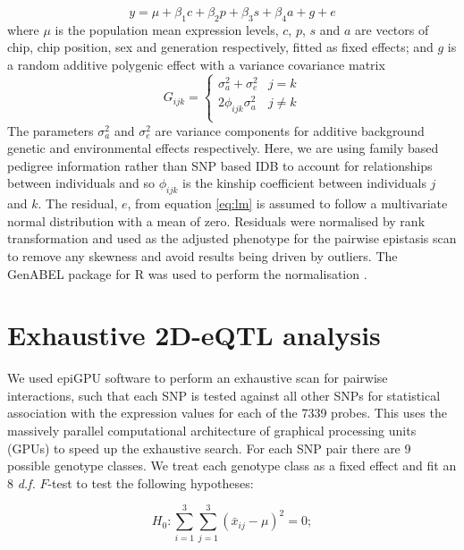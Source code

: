 \documentclass{article}
\begin{document}
\begin{equation}
y = \mu + \beta_{1}c + \beta_{2}p + \beta_{3}s + \beta_{4}a + g + e
\label{eq:lm}
\end{equation}
where $\mu$ is the population mean expression levels, $c$, $p$, $s$ and $a$ are vectors of chip, chip position, sex and generation respectively, fitted as fixed effects; and $g$ is a random additive polygenic effect with a variance covariance matrix 
\begin{equation}
G_{ijk} = \left \{ 
\begin{array}{ll}
\sigma _a ^2 + \sigma _e ^2&        j = k \\ 
2\phi _{ijk} \sigma _a ^2& 			j \neq k \\
\end{array} \right.
\end{equation}
The parameters $\sigma_a^2$ and $\sigma_e^2$ are variance components for additive background genetic and environmental effects respectively. Here, we are using family based pedigree information rather than SNP based IDB to account for relationships between individuals and so $\phi _{ijk}$ is the kinship coefficient between individuals $j$ and $k$. The residual, $e$, from equation \ref{eq:lm} is assumed to follow a multivariate normal distribution with a mean of zero. Residuals were normalised by rank transformation and used as the adjusted phenotype for the pairwise epistasis scan to remove any skewness and avoid results being driven by outliers. The GenABEL package for R was used to perform the normalisation \cite{Aulchenko2007}.


\section{Exhaustive 2D-eQTL analysis}

We used epiGPU \cite{Hemani2011} software to perform an exhaustive scan for pairwise interactions, such that each SNP is tested against all other SNPs for statistical association with the expression values for each of the 7339 probes. This uses the massively parallel computational architecture of graphical processing units (GPUs) to speed up the exhaustive search. For each SNP pair there are 9 possible genotype classes. We treat each genotype class as a fixed effect and fit an 8 \emph{d.f.} $F$-test to test the following hypotheses:

\begin{equation}
H _0 : \sum _{i=1} ^3 \sum _{j=1} ^3 (\bar x _{ij} - \mu) ^2 = 0; 
\end{equation}
\end{document}
